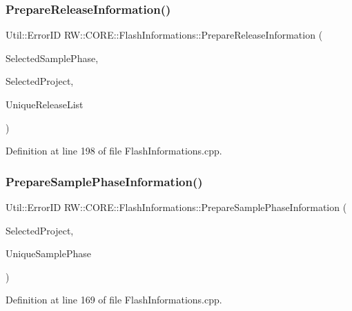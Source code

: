 \subsubsection{\texorpdfstring{Prepare\+Release\+Information()}{PrepareReleaseInformation()}}
{\footnotesize\ttfamily Util\+::\+Error\+ID R\+W\+::\+C\+O\+R\+E\+::\+Flash\+Informations\+::\+Prepare\+Release\+Information (\begin{DoxyParamCaption}\item[{Q\+String}]{Selected\+Sample\+Phase,  }\item[{Q\+String}]{Selected\+Project,  }\item[{Q\+List$<$ Q\+String $>$ \&}]{Unique\+Release\+List }\end{DoxyParamCaption})\hspace{0.3cm}{\ttfamily [private]}}



Definition at line 198 of file Flash\+Informations.\+cpp.

\hypertarget{class_r_w_1_1_c_o_r_e_1_1_flash_informations_acfe7f2e69b85b4a62b7dff2bd2131049}{}\label{class_r_w_1_1_c_o_r_e_1_1_flash_informations_acfe7f2e69b85b4a62b7dff2bd2131049} 
\subsubsection{\texorpdfstring{Prepare\+Sample\+Phase\+Information()}{PrepareSamplePhaseInformation()}}
{\footnotesize\ttfamily Util\+::\+Error\+ID R\+W\+::\+C\+O\+R\+E\+::\+Flash\+Informations\+::\+Prepare\+Sample\+Phase\+Information (\begin{DoxyParamCaption}\item[{Q\+String}]{Selected\+Project,  }\item[{Q\+List$<$ Q\+String $>$ \&}]{Unique\+Sample\+Phase }\end{DoxyParamCaption})\hspace{0.3cm}{\ttfamily [private]}}



Definition at line 169 of file Flash\+Informations.\+cpp.

\hypertarget{class_r_w_1_1_c_o_r_e_1_1_flash_informations_a1584d6557b93628bc86db88af13d0d4b}{}\label{class_r_w_1_1_c_o_r_e_1_1_flash_informations_a1584d6557b93628bc86db88af13d0d4b} 
